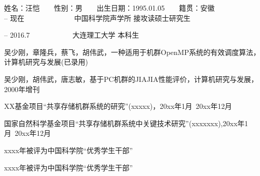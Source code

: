 \begin{resume}

\noindent
姓名：汪恺　　性别：男　　出生日期：1995.01.05　　籍贯：安徽\\

 -- 现在　　　　　　　中国科学院声学所 接攻读硕士研究生

 -- 2016.7　　　　　　大连理工大学 本科生\\


  \begin{enumerate}[{[}1{]}]
  \item 吴少刚，章隆兵，蔡飞，胡伟武，一种适用于机群OpenMP系统的有效调度算法，计算机研究与发展(已录用)
  \item 吴少刚，胡伟武，唐志敏，基于PC机群的JIAJIA性能评价，计算机研究与发展，2000年增刊

  \end{enumerate}

  \begin{enumerate}[{[}1{]}]
  \item XX基金项目“共享存储机群系统的研究”(xxxxx)，20xx年1月~20xx年12月
  \item 国家自然科学基金项目“共享存储机群系统中关键技术研究”(xxxxxxx),20xx年1月~20xx年12月
  \end{enumerate}

  \begin{enumerate}[{[}1{]}]
  \item  xxxx年被评为中国科学院“优秀学生干部”
  \item xxxx年被评为中国科学院“优秀学生干部”
  \end{enumerate}
\end{resume}
